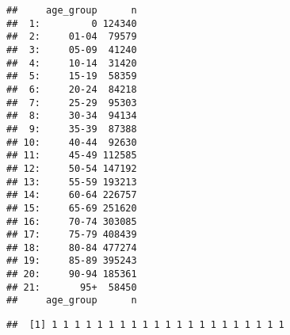 \documentclass[
]{article}
\newenvironment{Shaded}{\begin{snugshade}}{\end{snugshade}}
\newcommand{\DecValTok}[1]{\textcolor[rgb]{0.00,0.00,0.81}{#1}}
\newcommand{\NormalTok}[1]{#1}
\newcommand{\SpecialCharTok}[1]{\textcolor[rgb]{0.00,0.00,0.00}{#1}}
\begin{document}
\begin{verbatim}
##     age_group      n
##  1:         0 124340
##  2:     01-04  79579
##  3:     05-09  41240
##  4:     10-14  31420
##  5:     15-19  58359
##  6:     20-24  84218
##  7:     25-29  95303
##  8:     30-34  94134
##  9:     35-39  87388
## 10:     40-44  92630
## 11:     45-49 112585
## 12:     50-54 147192
## 13:     55-59 193213
## 14:     60-64 226757
## 15:     65-69 251620
## 16:     70-74 303085
## 17:     75-79 408439
## 18:     80-84 477274
## 19:     85-89 395243
## 20:     90-94 185361
## 21:       95+  58450
##     age_group      n
\end{verbatim}

\begin{Shaded}
\end{Shaded}

\begin{verbatim}
##  [1] 1 1 1 1 1 1 1 1 1 1 1 1 1 1 1 1 1 1 1 1 1
\end{verbatim}
\end{document}
